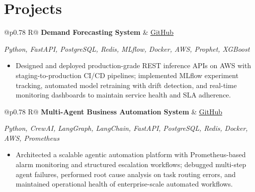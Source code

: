 \documentclass[a4paper,10pt]{article}
\newcommand{\ulink}[2]{\href{#1}{\uline{#2}}}
\newcommand{\subheading}[1]{{\color[HTML]{0A0A0A}\fontsize{12}{14}\selectfont\bfseries #1}}
\newcommand{\techstack}[1]{{\color[HTML]{5C5C5C}\fontsize{10.5}{12.5}\selectfont\itshape #1}}
\newcommand{\meta}[1]{{\color[HTML]{5C5C5C}\fontsize{10.5}{12.5}\selectfont #1}}
\begin{document}
\vspace{2pt}

\section{Projects}
\vspace{2pt}

\begin{tabularx}{\linewidth}{@{}p{0.78\linewidth} R@{}}
\subheading{Demand Forecasting System} & \meta{\ulink{https://github.com/su-jin1425/Demand-Forecasting-System}{GitHub}}
\end{tabularx}
\vspace{1pt}
\techstack{Python, FastAPI, PostgreSQL, Redis, MLflow, Docker, AWS, Prophet, XGBoost}
\begin{itemize}[nosep, leftmargin=1.5em, itemsep=1pt, topsep=2pt]
\item {\color[HTML]{0A0A0A}\fontsize{11}{14}\selectfont
Designed and deployed production-grade REST inference APIs on AWS with staging-to-production CI/CD pipelines; implemented MLflow experiment tracking, automated model retraining with drift detection, and real-time monitoring dashboards to maintain service health and SLA adherence.}
\end{itemize}

\vspace{2pt}

\begin{tabularx}{\linewidth}{@{}p{0.78\linewidth} R@{}}
\subheading{Multi-Agent Business Automation System} & \meta{\ulink{https://github.com/su-jin1425/Multi-Agent-Business-Automation}{GitHub}}
\end{tabularx}
\vspace{1pt}
\techstack{Python, CrewAI, LangGraph, LangChain, FastAPI, PostgreSQL, Redis, Docker, AWS, Prometheus}
\begin{itemize}[nosep, leftmargin=1.5em, itemsep=1pt, topsep=2pt]
\item {\color[HTML]{0A0A0A}\fontsize{11}{14}\selectfont
Architected a scalable agentic automation platform with Prometheus-based alarm monitoring and structured escalation workflows; debugged multi-step agent failures, performed root cause analysis on task routing errors, and maintained operational health of enterprise-scale automated workflows.}
\end{itemize}

\vspace{2pt}
\end{document}
